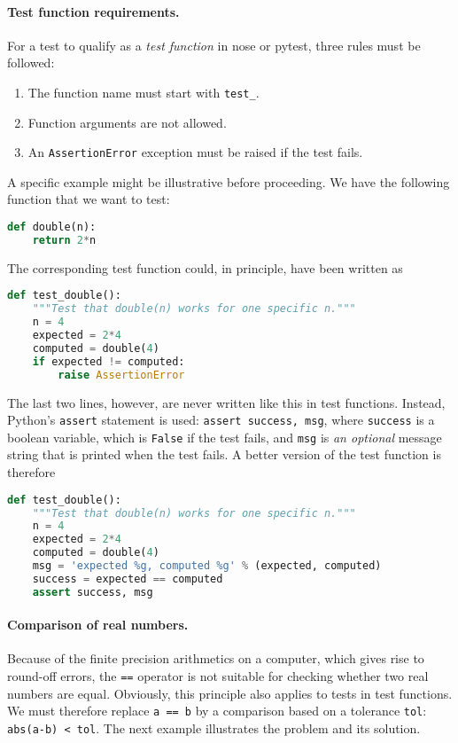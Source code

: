 \documentclass[graybox,sectrefs,envcountresetchap,open=right,final]{svmonodo}
\begin{document}
\paragraph{Test function requirements.}
For a test to qualify as a \emph{test function} in nose or pytest, three
rules must be followed:

\begin{enumerate}
 \item The function name must start with \Verb!test_!.

 \item Function arguments are not allowed.

 \item An \texttt{AssertionError} exception must be raised if the test fails.
\end{enumerate}

\noindent
A specific example might be illustrative before proceeding.
We have the following function that we want to test:

\begin{lstlisting}[language=Python,style=blue1_bluegreen]
def double(n):
    return 2*n
\end{lstlisting}
The corresponding test function could, in principle, have been written
as

\begin{lstlisting}[language=Python,style=blue1_bluegreen]
def test_double():
    """Test that double(n) works for one specific n."""
    n = 4
    expected = 2*4
    computed = double(4)
    if expected != computed:
        raise AssertionError
\end{lstlisting}
The last two lines, however, are never written like this in test functions.
Instead, Python's \texttt{assert} statement is used: \texttt{assert success, msg}, where
\texttt{success} is a boolean variable, which is \texttt{False} if the test fails, and
\texttt{msg} is \emph{an optional} message string that is printed when the test fails.
A better version of the test function is therefore

\begin{lstlisting}[language=Python,style=blue1_bluegreen]
def test_double():
    """Test that double(n) works for one specific n."""
    n = 4
    expected = 2*4
    computed = double(4)
    msg = 'expected %g, computed %g' % (expected, computed)
    success = expected == computed
    assert success, msg
\end{lstlisting}

\paragraph{Comparison of real numbers.}
Because of the finite precision arithmetics on a computer, which gives
rise to round-off errors, the \texttt{==} operator is not suitable for
checking whether two real numbers are equal. Obviously, this principle
also applies to tests in test functions.
We must therefore replace \texttt{a == b} by a comparison
based on a tolerance \texttt{tol}: \texttt{abs(a-b) < tol}. The next example illustrates
the problem and its solution.
\end{document}
